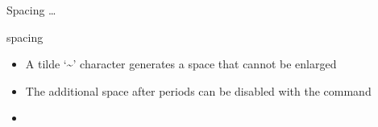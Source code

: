 \documentclass{beamer}
\begin{document}
\begin{frame}{Spacing \ldots}
\begin{block}{spacing}
\begin{itemize}
\pause \item A tilde ‘\~{}’ character generates a space that cannot be enlarged
\pause \item The additional space after periods can be disabled with the command  
\pause \item[] 
\end{itemize}
\end{block}
\end{frame}
\end{document}
